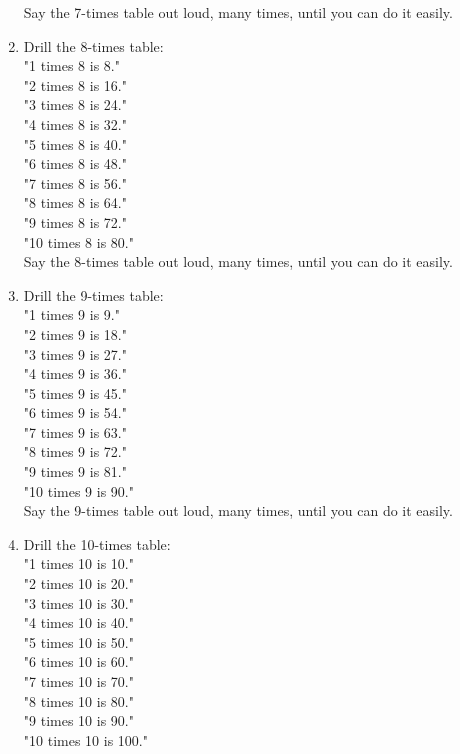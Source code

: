 \documentclass[12pt]{article}
\begin{document}
\begin{enumerate}
Say the 7-times table out loud, many times, until you can do it easily.\\

\item Drill the 8-times table:\\

"1 times 8 is 8."\\
"2 times 8 is 16."\\
"3 times 8 is 24."\\
"4 times 8 is 32."\\
"5 times 8 is 40."\\
"6 times 8 is 48."\\
"7 times 8 is 56."\\
"8 times 8 is 64."\\
"9 times 8 is 72."\\
"10 times 8 is 80."\\

Say the 8-times table out loud, many times, until you can do it easily.\\

\item Drill the 9-times table:\\

"1 times 9 is 9."\\
"2 times 9 is 18."\\
"3 times 9 is 27."\\
"4 times 9 is 36."\\
"5 times 9 is 45."\\
"6 times 9 is 54."\\
"7 times 9 is 63."\\
"8 times 9 is 72."\\
"9 times 9 is 81."\\
"10 times 9 is 90."\\

Say the 9-times table out loud, many times, until you can do it easily.\\

\item Drill the 10-times table:\\

"1 times 10 is 10."\\
"2 times 10 is 20."\\
"3 times 10 is 30."\\
"4 times 10 is 40."\\
"5 times 10 is 50."\\
"6 times 10 is 60."\\
"7 times 10 is 70."\\
"8 times 10 is 80."\\
"9 times 10 is 90."\\
"10 times 10 is 100."\\


\end{enumerate}
\end{document}
